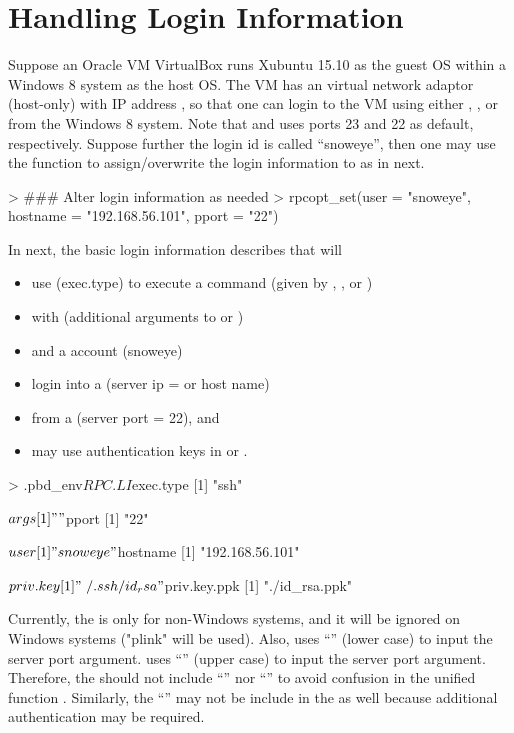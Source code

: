 \section[Handling Login Information]{Handling Login Information}
\label{sec:handling_login_information}

Suppose an Oracle VM VirtualBox runs Xubuntu 15.10 as the guest OS within a
Windows 8 system as the host OS.
The VM has an virtual network adaptor (host-only)
with IP address , so that one can
login to the VM using either , , or 
from the Windows 8 system.
Note that  and  uses ports 23 and 22 as default,
respectively.
Suppose further the login id is called ``snoweye'', then one may use
the function  to assign/overwrite the login information to
 as in next.
\begin{Code}[title=Set login information]
> ### Alter login information as needed
> rpcopt_set(user = "snoweye", hostname = "192.168.56.101", pport = "22")
\end{Code}

In next, the basic login information  describes that
 will
\begin{itemize}
\item use  (exec.type) to execute a command
      (given by , , or )
\item with  (additional arguments to  or )
\item and a  account (snoweye)
\item login into a  (server ip =  or
      host name)
\item from a  (server port = 22), and
\item may use authentication keys in  or .
\end{itemize}
\begin{Code}[title=Basic \code{RPC.LI}]
> .pbd_env$RPC.LI
$exec.type
[1] "ssh"

$args
[1] ""

$pport
[1] "22"

$user
[1] "snoweye"

$hostname
[1] "192.168.56.101"

$priv.key
[1] "~/.ssh/id_rsa"

$priv.key.ppk
[1] "./id_rsa.ppk"
\end{Code}
Currently, the  is only for non-Windows systems, and it
will be ignored on Windows systems ("plink" will be used).
Also,  uses ``'' (lower case) to input the server port
argument.
 uses ``'' (upper case) to input the server port
argument.
Therefore, the  should not include ``'' nor ``''
to avoid confusion in the unified function .
Similarly, the ``'' may not be include in the  as well
because additional authentication may be required.

